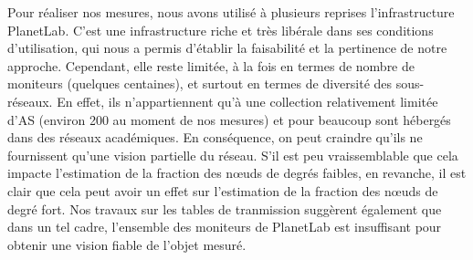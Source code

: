 Pour réaliser nos mesures, nous avons utilisé à plusieurs reprises
l'infrastructure PlanetLab. C'est une infrastructure riche et très libérale dans
ses conditions d'utilisation, qui nous a permis d'établir la faisabilité et la
pertinence de notre approche. Cependant, elle reste limitée, à la fois en termes
de nombre de moniteurs (quelques centaines), et surtout en termes de diversité
des sous-réseaux. En effet, ils n'appartiennent qu'à une collection relativement
limitée d'AS (environ 200 au moment de nos mesures) et pour beaucoup sont
hébergés dans des réseaux académiques. En conséquence, on peut craindre qu'ils
ne fournissent qu'une vision partielle du réseau. S'il est peu vraissemblable
que cela impacte l'estimation de la fraction des n\oe{}uds de degrés faibles, en
revanche, il est clair que cela peut avoir un effet sur l'estimation de la
fraction des n\oe{}uds de degré fort. Nos travaux sur les tables de tranmission
suggèrent également que dans un tel cadre, l'ensemble des moniteurs de PlanetLab
est insuffisant pour obtenir une vision fiable de l'objet mesuré.

